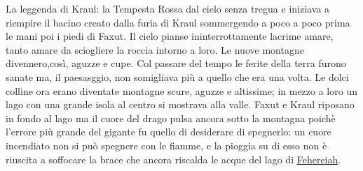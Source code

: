 \begin{commentbox}{La leggenda di Kraul: la Tempesta Rossa}
  dal cielo senza tregua e iniziava a riempire il bacino creato dalla furia di Kraul
  sommergendo a poco a poco prima le mani poi i piedi di Faxut.
  Il cielo pianse ininterrottamente lacrime amare, tanto amare da
  sciogliere la roccia intorno a loro. Le nuove montagne divennero,cos\`i, aguzze e cupe.
  Col passare del tempo le ferite della terra furono sanate ma, il paesasggio, non
  somigliava pi\`u a quello che era una volta. Le dolci colline ora erano diventate
  montagne scure, aguzze e altissime; in mezzo a loro un lago con una grande isola al centro
  si mostrava alla valle.
  Faxut e Kraul riposano in fondo al lago ma il cuore del drago pulsa ancora sotto la
  montagna poich\`e l'errore pi\`u grande del gigante fu quello di desiderare di spegnerlo:
  un cuore incendiato non si pu\`o spegnere con le fiamme, e la pioggia su di esso non \`e
  riuscita a soffocare la brace che ancora riscalda le acque del lago di \hyperref[loc:fehereiah]{Fehereiah}.

\end{commentbox}
